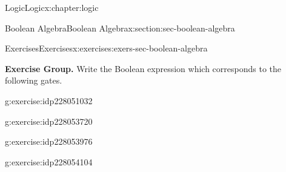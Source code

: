 \documentclass[twoside,10pt,]{book}
\numberwithin{equation}{section}
\begin{document}
\begin{chapterptx}{Logic}{}{Logic}{}{}{x:chapter:logic}
\begin{sectionptx}{Boolean Algebra}{}{Boolean Algebra}{}{}{x:section:sec-boolean-algebra}
\begin{exercises-subsection}{Exercises}{}{Exercises}{}{}{x:exercises:exers-sec-boolean-algebra}
\begin{exercisegroup}
\end{exercisegroup}
\par\medskip\noindent
\par\medskip\noindent%
\textbf{Exercise Group.}\space\space%
Write the Boolean expression which corresponds to the following gates.\begin{exercisegroup}
\begin{divisionexerciseeg}{10}{}{}{g:exercise:idp228051032}%
\begin{image}{0.4}{0.2}{0.4}%
%
\end{image}%
\end{divisionexerciseeg}%
\begin{divisionexerciseeg}{11}{}{}{g:exercise:idp228053720}%
\begin{image}{0.4}{0.2}{0.4}%
%
\end{image}%
\end{divisionexerciseeg}%
\begin{divisionexerciseeg}{12}{}{}{g:exercise:idp228053976}%
\begin{image}{0.4}{0.2}{0.4}%
%
\end{image}%
\end{divisionexerciseeg}%
\begin{divisionexerciseeg}{13}{}{}{g:exercise:idp228054104}%
\begin{image}{0.4}{0.2}{0.4}%
\resizebox{\linewidth}{!}{%
\begin{circuitikz}

\end{circuitikz}}
\end{image}
\end{divisionexerciseeg}
\end{exercisegroup}
\end{exercises-subsection}
\end{sectionptx}
\end{chapterptx}
\end{document}
